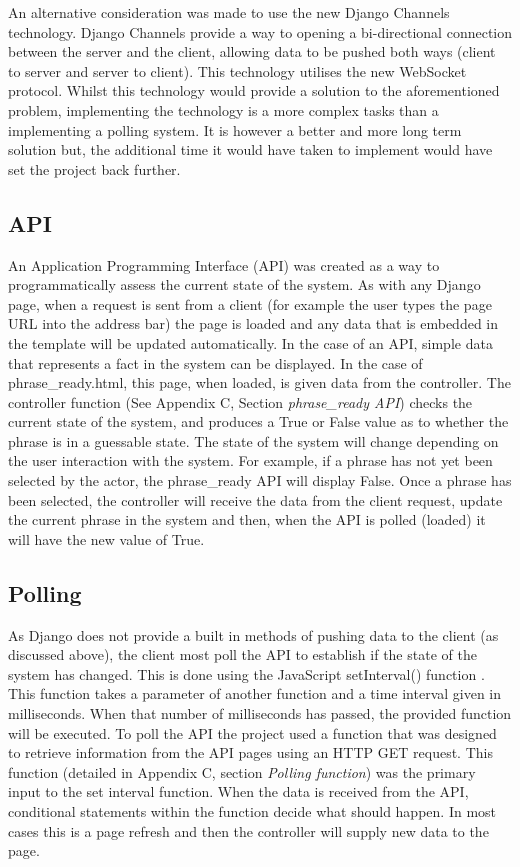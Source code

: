 An alternative consideration was made to use the new Django Channels technology. Django Channels provide a way to opening a bi-directional connection between the server and the client, allowing data to be pushed both ways (client to server and server to client)\cite{django_channels}. This technology utilises the new WebSocket protocol. Whilst this technology would provide a solution to the aforementioned problem, implementing the technology is a more complex tasks than a implementing a polling system. It is however a better and more long term solution but, the additional time it would have taken to implement would have set the project back further.

\subsection{API}
An Application Programming Interface (API) was created as a way to programmatically assess the current state of the system. As with any Django page, when a request is sent from a client (for example the user types the page URL into the address bar) the page is loaded and any data that is embedded in the template will be updated automatically. In the case of an API, simple data that represents a fact in the system can be displayed. In the case of phrase\_ready.html, this page, when loaded, is given data from the controller. The controller function (See Appendix C, Section \textit{phrase\_ready API}) checks the current state of the system, and produces a True or False value as to whether the phrase is in a guessable state. The state of the system will change depending on the user interaction with the system. For example, if a phrase has not yet been selected by the actor, the phrase\_ready API will display False. Once a phrase has been selected, the controller will receive the data from the client request, update the current phrase in the system and then, when the API is polled (loaded) it will have the new value of True.

\subsection{Polling}
As Django does not provide a built in methods of pushing data to the client (as discussed above), the client most poll the API to establish if the state of the system has changed. This is done using the JavaScript setInterval() function \cite{js_setinterval}. This function takes a parameter of another function and a time interval given in milliseconds. When that number of milliseconds has passed, the provided function will be executed. To poll the API the project used a function that was designed to retrieve information from the API pages using an HTTP GET request. This function (detailed in Appendix C, section \textit{Polling function}) was the primary input to the set interval function. When the data is received from the API, conditional statements within the function decide what should happen. In most cases this is a page refresh and then the controller will supply new data to the page.

